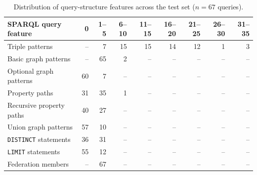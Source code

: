 \begin{table}[t]
    \centering
    \small
    \caption{
        Distribution of query-structure features across the test set ($n=67$ queries).
    }
    \label{tab:binQueryStat}

    \setlength{\tabcolsep}{4pt}
    \renewcommand{\arraystretch}{1.12}

    \begin{tabular}{lrrrrrrrr}
        \hline
        \textbf{SPARQL query feature}
            & \textbf{0}
            & \textbf{1--5}
            & \textbf{6--10}
            & \textbf{11--15}
            & \textbf{16--20}
            & \textbf{21--25}
            & \textbf{26--30}
            & \textbf{31--35} \\
        \hline

        Triple patterns
            & --
            & 7
            & 15
            & 15
            & 14
            & 12
            & 1
            & 3 \\

        Basic graph patterns
            & --
            & 65
            & 2
            & --
            & --
            & --
            & --
            & -- \\

        Optional graph patterns
            & 60
            & 7
            & --
            & --
            & --
            & --
            & --
            & -- \\

        Property paths
            & 31
            & 35
            & 1
            & --
            & --
            & --
            & --
            & -- \\

        Recursive property paths
            & 40
            & 27
            & --
            & --
            & --
            & --
            & --
            & -- \\

        Union graph patterns
            & 57
            & 10
            & --
            & --
            & --
            & --
            & --
            & -- \\

        \texttt{DISTINCT} statements
            & 36
            & 31
            & --
            & --
            & --
            & --
            & --
            & -- \\

        \texttt{LIMIT} statements
            & 55
            & 12
            & --
            & --
            & --
            & --
            & --
            & -- \\

        Federation members
            & --
            & 67
            & --
            & --
            & --
            & --
            & --
            & -- \\
        \hline
    \end{tabular}
\end{table}